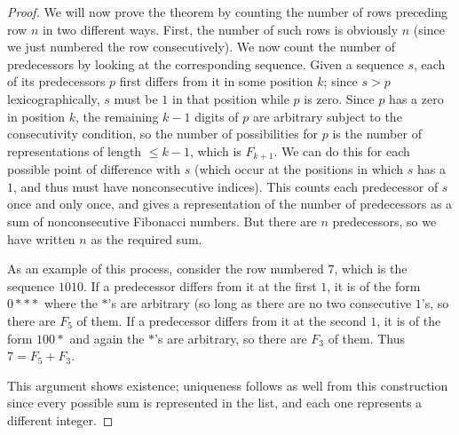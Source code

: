 \documentclass[12pt]{article}
\begin{document}
\begin{proof}
We will now prove the theorem by counting the number of rows preceding row $n$ in two different ways. First, the number of such rows is obviously $n$ (since we just numbered the row consecutively). We now count the number of predecessors by looking at the corresponding sequence. Given a sequence $s$, each of its predecessors $p$ first differs from it in some position $k$; since $s>p$ lexicographically, $s$ must be $1$ in that position while $p$ is zero. Since $p$ has a zero in position $k$, the remaining $k-1$ digits of $p$ are arbitrary subject to the consecutivity condition, so the number of possibilities for $p$ is the number of representations of length $\leq k-1$, which is $F_{k+1}$. We can do this for each possible point of difference with $s$ (which occur at the positions in which $s$ has a $1$, and thus must have nonconsecutive indices). This counts each predecessor of $s$ once and only once, and gives a representation of the number of predecessors as a sum of nonconsecutive Fibonacci numbers. But there are $n$ predecessors, so we have written $n$ as the required sum.

As an example of this process, consider the row numbered $7$, which is the sequence $1010$. If a predecessor differs from it at the first $1$, it is of the form $0***$ where the $*$'s are arbitrary (so long as there are no two consecutive $1$'s, so there are $F_5$ of them. If a predecessor differs from it at the second $1$, it is of the form $100*$ and again the $*$'s are arbitrary, so there are $F_3$ of them. Thus $7=F_5+F_3$.

This argument shows existence; uniqueness follows as well from this construction since every possible sum is represented in the list, and each one represents a different integer.

\end{proof}
\end{document}
